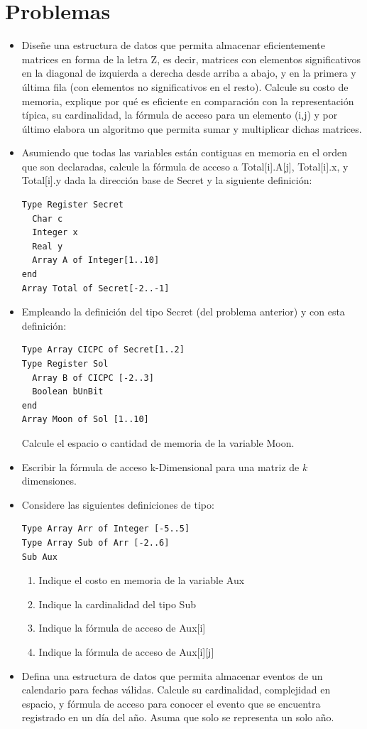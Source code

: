 \section{Problemas}

\begin{itemize}
\item Diseñe una estructura de datos que permita almacenar eficientemente matrices en forma de la letra Z, es decir, matrices con elementos significativos en la diagonal de izquierda a derecha desde arriba a abajo, y en la primera y última fila (con elementos no significativos en el resto). Calcule su costo de memoria, explique por qué es eficiente en comparación con la representación típica, su cardinalidad, la fórmula de acceso para un elemento (i,j) y por último elabora un algoritmo que permita sumar y multiplicar dichas matrices.
\item Asumiendo que todas las variables están contiguas en memoria en el orden que son declaradas, calcule la fórmula de acceso a Total[i].A[j], Total[i].x, y Total[i].y dada la dirección base de Secret y la siguiente definición:
\begin{lstlisting}[upquote=true, language=pseudo]
Type Register Secret
  Char c
  Integer x
  Real y
  Array A of Integer[1..10]
end
Array Total of Secret[-2..-1]
\end{lstlisting}
\item Empleando la definición del tipo Secret (del problema anterior) y con esta definición:
\begin{lstlisting}[upquote=true, language=pseudo]
Type Array CICPC of Secret[1..2]
Type Register Sol
  Array B of CICPC [-2..3]
  Boolean bUnBit
end
Array Moon of Sol [1..10]
\end{lstlisting}
Calcule el espacio o cantidad de memoria de la variable Moon.
\item Escribir la fórmula de acceso k-Dimensional para una matriz de $k$ dimensiones.
\item Considere las siguientes definiciones de tipo:
\begin{lstlisting}[upquote=true, language=pseudo]
Type Array Arr of Integer [-5..5]
Type Array Sub of Arr [-2..6]
Sub Aux
\end{lstlisting}
\begin{enumerate}
\item Indique el costo en memoria de la variable Aux
\item Indique la cardinalidad del tipo Sub
\item Indique la fórmula de acceso de Aux[i]
\item Indique la fórmula de acceso de Aux[i][j]
\end{enumerate}
\item Defina una estructura de datos que permita almacenar eventos de un calendario para fechas válidas. Calcule su cardinalidad, complejidad en espacio, y fórmula de acceso para conocer el evento que se encuentra registrado en un día del año. Asuma que solo se representa un solo año.
\end{itemize}



